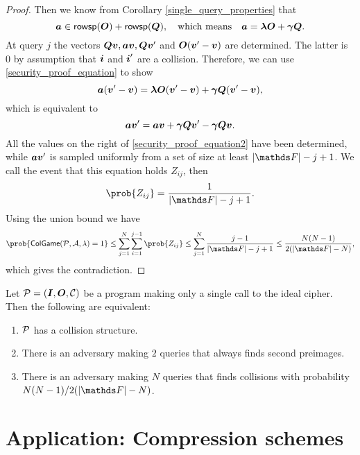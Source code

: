 \begin{proof}
    Then we know from Corollary \ref{single_query_properties} that
    \begin{equation}
    \label{security_proof_equation}
    \va \in \rowsp(\O) + \rowsp(\Q) ,\quad \textrm{which means} \quad \va = \v \lambda \O + \v \gamma \Q.
    \end{equation}
    At query $j$ the vectors $\Q\vv, \va\vv, \Q\vv'$ and $\O(\vv' - \vv)$ are determined.
    The latter is $0$ by assumption that $\v i$ and $\v i'$ are a collision.
    Therefore, we can use \eqref{security_proof_equation} to show
    \begin{equation*}
    \va (\vv' - \vv) = \v\lambda\O(\vv' - \vv) + \v\gamma \Q (\vv' - \vv),
    \end{equation*}
    which is equivalent to
    \begin{equation}
    \label{security_proof_equation2}
    \va \vv' = \va\vv + \v\gamma \Q \vv' - \v\gamma \Q\vv.
    \end{equation}
    All the values on the right of \eqref{security_proof_equation2} have been determined,
    while $\va\vv'$ is sampled uniformly from a set of size at least $|\F| - j + 1$.
    We call the event that this equation holds $Z_{ij}$, then
    \[
        \prob{Z_{ij}} = \frac{1}{|\F| - j + 1}.
    \]
    Using the union bound we have
    \begin{equation*}
    \prob{\mathsf{ColGame}(\P,\A,\lambda) = 1}
    \leq \sum_{j=1}^N \sum_{i=1}^{j-1} \prob{Z_{ij}}
    \leq \sum_{j=1}^N \frac{j - 1}{|\F| - j + 1}
    \leq \frac{N(N-1)}{2(|\F| - N)},
    \end{equation*}
    which gives the contradiction.
\end{proof}

\begin{corollary}
\label{corollary_single_query_cr_resistance}
    Let $\P = (\I, \O, \C)$ be a program making only a single call to the ideal cipher.
    Then the following are equivalent:
    \begin{enumerate}
    \item $\P$ has a collision structure.
    \item There is an adversary making $2$ queries that always finds second preimages.
    \item There is an adversary making $N$ queries that finds collisions with probability $N(N-1) / 2(|\F| - N)$.
    \end{enumerate}
\end{corollary}

\section{Application: Compression schemes}

